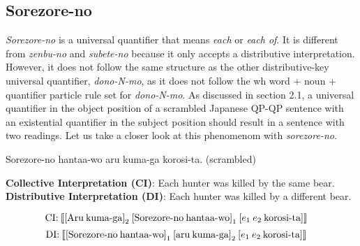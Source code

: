 \documentclass[english, 11pt]{article}
\begin{document}
\subsection{Sorezore-no}
\emph{Sorezore-no} is a universal quantifier that means \emph{each} or \emph{each of}. It is different from \emph{zenbu-no} and \emph{subete-no} because it only accepts a distributive interpretation. However, it does not follow the same structure as the other distributive-key universal quantifier, \emph{dono-N-mo}, as it does not follow the wh word + noun + quantifier particle rule set for \emph{dono-N-mo}. As discussed in section 2.1, a universal quantifier in the object position of a scrambled Japanese QP-QP sentence with an existential quantifier in the subject position should result in a sentence with two readings. Let us take a closer look at this phenomenom with \emph{sorezore-no}.
\begin{exe}
	\label{1a}
\end{exe}
\begin {exe}
	\ex Sorezore-no hantaa-wo aru kuma-ga korosi-ta. (scrambled)
		\begin {xlist} 
			\ex \textbf{Collective Interpretation (CI)}: Each hunter was killed by the same bear.
			\ex \textbf{Distributive Interpretation (DI)}: Each hunter was killed by a different bear.
		\end {xlist}
\end {exe}
\begin{equation}
	\text{CI:\:} \llbracket  \text{[Aru\:kuma-ga]}_{2}\:\text{[Sorezore-no\:hantaa-wo]}_{1}\:[e_{1}\:e_{2}\:\text{korosi-ta}] \rrbracket \quad
\end{equation}
\begin{equation}
	\text{DI:\:} \llbracket  \text{[Sorezore-no\:hantaa-wo]}_{1}\:\text{[aru\:kuma-ga]}_{2}\:[e_{1}\:e_{2}\:\text{korosi-ta}] \rrbracket \quad
\end{equation}
\end{document}
